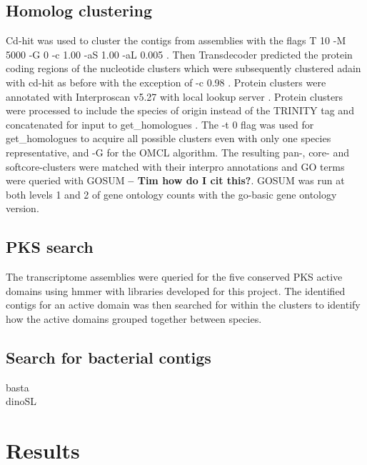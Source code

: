 \documentclass[12pt]{article}
\begin{document}
\subsection*{Homolog clustering}
Cd-hit was used to cluster the contigs from assemblies with the flags T 10 -M 5000 -G 0 -c 1.00 -aS 1.00 -aL 0.005 \cite{fu2012cd}. 
Then Transdecoder predicted the protein coding regions of the nucleotide clusters which were subsequently clustered adain with cd-hit as before with the exception of -c 0.98 \cite{haas2016transdecoder}.
Protein clusters were annotated with Interproscan v5.27 with local lookup server \cite{quevillon2005interproscan}.
Protein clusters were processed to include the species of origin instead of the TRINITY tag and concatenated for input to get\_homologues \cite{vinuesa2015robust}. 
The -t 0 flag was used for get\_homologues to acquire all possible clusters even with only one species representative, and -G for the OMCL algorithm. 
The resulting pan-, core- and softcore-clusters were matched with their interpro annotations and GO terms were queried with GOSUM \textbf{-- Tim how do I cit this?}. 
GOSUM was run at both levels 1 and 2 of gene ontology counts with the go-basic gene ontology version. 

\subsection*{PKS search}
The transcriptome assemblies were queried for the five conserved PKS active domains using hmmer \cite{eddy2015hmmer} with libraries developed for this project. 
The identified contigs for an active domain was then searched for within the clusters to identify how the active domains grouped together between species.

\subsection*{Search for bacterial contigs}
basta\\
dinoSL

\newpage
\section*{Results}
\FloatBarrier
\end{document}
